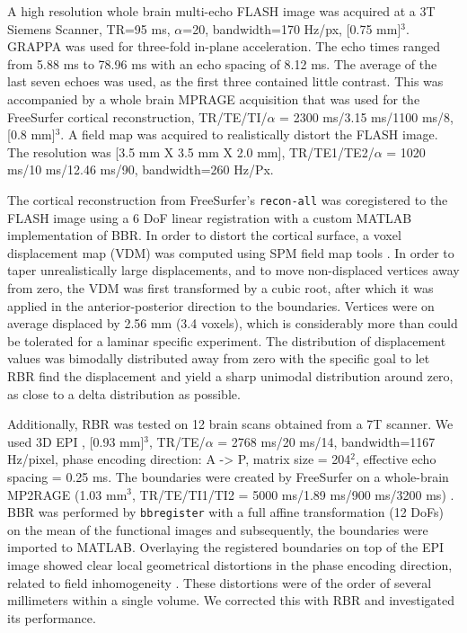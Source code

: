 A high resolution whole brain multi-echo FLASH image \cite{Haase1986} was acquired at a 3T Siemens Scanner, TR=95 ms, $\alpha$=20\textdegree, bandwidth=170 Hz/px, [0.75 mm]$^3$. GRAPPA was used for three-fold in-plane acceleration. The echo times ranged from 5.88 ms to 78.96 ms with an echo spacing of 8.12 ms. The average of the last seven echoes was used, as the first three contained little contrast. This was accompanied by a whole brain MPRAGE acquisition that was used for the FreeSurfer cortical reconstruction, TR/TE/TI/$\alpha$ = 2300 ms/3.15 ms/1100 ms/8\textdegree, [0.8 mm]$^3$. A field map was acquired to realistically distort the FLASH image. The resolution was [3.5 mm X 3.5 mm X 2.0 mm], TR/TE1/TE2/$\alpha$ = 1020 ms/10 ms/12.46 ms/90\textdegree, bandwidth=260 Hz/Px.

The cortical reconstruction from FreeSurfer's \texttt{recon-all} \cite{Dale1999} was coregistered to the FLASH image using a 6 DoF linear registration with a custom MATLAB implementation of BBR. In order to distort the cortical surface, a voxel displacement map (VDM) was computed using SPM field map tools \cite{Andersson2001}. 
In order to taper unrealistically large displacements, and to move non-displaced vertices away from zero, the VDM was first transformed by a cubic root, after which it was applied in the anterior-posterior direction to the boundaries. Vertices were on average displaced by 2.56 mm (3.4 voxels), which is considerably more than could be tolerated for a laminar specific experiment. The distribution of displacement values was bimodally distributed away from zero with the specific goal to let RBR find the displacement and yield a sharp unimodal distribution around zero, as close to a delta distribution as possible.

Additionally, RBR was tested on 12 brain scans obtained from a 7T scanner. We used 3D EPI \cite{Poser2010}, [0.93 mm]$^3$, TR/TE/$\alpha$ = 2768 ms/20 ms/14\textdegree, bandwidth=1167 Hz/pixel, phase encoding direction: A -> P, matrix size = 204$^2$, effective echo spacing = 0.25 ms. The boundaries were created by FreeSurfer on a whole-brain MP2RAGE (1.03 mm$^3$, TR/TE/TI1/TI2 = 5000 ms/1.89 ms/900 ms/3200 ms) \cite{Marques2010}. BBR was performed by \texttt{bbregister} with a full affine transformation (12 DoFs) on the mean of the functional images and subsequently, the boundaries were imported to MATLAB. Overlaying the registered boundaries on top of the EPI image showed clear local geometrical distortions in the phase encoding direction, related to field inhomogeneity \cite{Jezzard1995}. These distortions were of the order of several millimeters within a single volume. We corrected this with RBR and investigated its performance.

